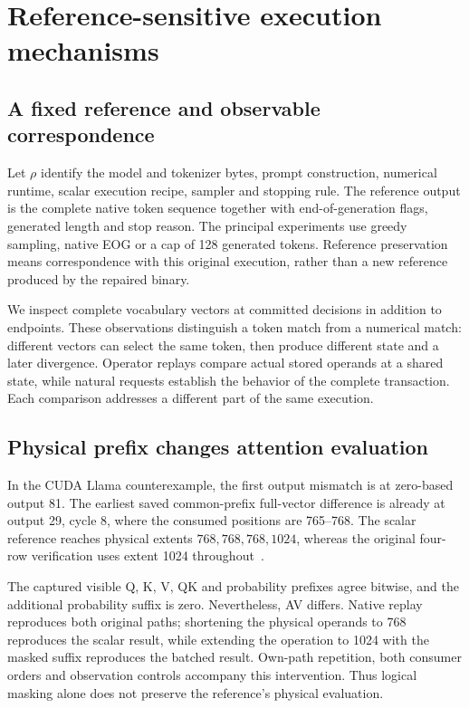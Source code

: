 \section{Reference-sensitive execution mechanisms}
\label{sec:mechanisms}
\subsection{A fixed reference and observable correspondence}
Let $\rho$ identify the model and tokenizer bytes, prompt construction, numerical runtime, scalar execution recipe, sampler and stopping rule. The reference output is the complete native token sequence together with end-of-generation flags, generated length and stop reason. The principal experiments use greedy sampling, native EOG or a cap of 128 generated tokens. Reference preservation means correspondence with this original execution, rather than a new reference produced by the repaired binary.

We inspect complete vocabulary vectors at committed decisions in addition to endpoints. These observations distinguish a token match from a numerical match: different vectors can select the same token, then produce different state and a later divergence. Operator replays compare actual stored operands at a shared state, while natural requests establish the behavior of the complete transaction. Each comparison addresses a different part of the same execution.

\subsection{Physical prefix changes attention evaluation}
\label{sec:extentmechanism}
In the CUDA Llama counterexample, the first output mismatch is at zero-based output 81. The earliest saved common-prefix full-vector difference is already at output 29, cycle 8, where the consumed positions are 765--768. The scalar reference reaches physical extents $768,768,768,1024$, whereas the original four-row verification uses extent 1024 throughout~\cite{rtxllamarepair}.

The captured visible Q, K, V, QK and probability prefixes agree bitwise, and the additional probability suffix is zero. Nevertheless, AV differs. Native replay reproduces both original paths; shortening the physical operands to 768 reproduces the scalar result, while extending the operation to 1024 with the masked suffix reproduces the batched result. Own-path repetition, both consumer orders and observation controls accompany this intervention. Thus logical masking alone does not preserve the reference's physical evaluation.

